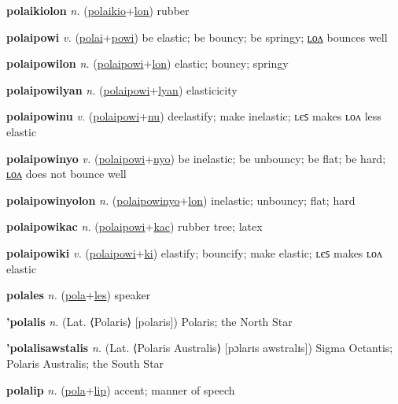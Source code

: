\textbf{\hypertarget{polaikiolon}{polaikiolon}} \textit{n.} (\hyperlink{polaikio}{polaikio}+\allowbreak \hyperlink{lon}{lon})
rubber

\textbf{\hypertarget{polaipowi}{polaipowi}} \textit{v.} (\hyperlink{polai}{polai}+\allowbreak \hyperlink{powi}{powi})
be elastic; be bouncy; be springy; \hyperlink{polaipowilon}{ʟᴏᴧ} bounces well

\textbf{\hypertarget{polaipowilon}{polaipowilon}} \textit{n.} (\hyperlink{polaipowi}{polaipowi}+\allowbreak \hyperlink{lon}{lon})
elastic; bouncy; springy

\textbf{\hypertarget{polaipowilyan}{polaipowilyan}} \textit{n.} (\hyperlink{polaipowi}{polaipowi}+\allowbreak \hyperlink{lyan}{lyan})
elasticicity

\textbf{\hypertarget{polaipowinu}{polaipowinu}} \textit{v.} (\hyperlink{polaipowi}{polaipowi}+\allowbreak \hyperlink{nu}{nu})
deelastify; make inelastic; ʟєꜱ makes ʟᴏᴧ less elastic

\textbf{\hypertarget{polaipowinyo}{polaipowinyo}} \textit{v.} (\hyperlink{polaipowi}{polaipowi}+\allowbreak \hyperlink{nyo}{nyo})
be inelastic; be unbouncy; be flat; be hard; \hyperlink{polaipowinyolon}{ʟᴏᴧ} does not bounce well

\textbf{\hypertarget{polaipowinyolon}{polaipowinyolon}} \textit{n.} (\hyperlink{polaipowinyo}{polaipowinyo}+\allowbreak \hyperlink{lon}{lon})
inelastic; unbouncy; flat; hard

\textbf{\hypertarget{polaipowikac}{polaipowikac}} \textit{n.} (\hyperlink{polaipowi}{polaipowi}+\allowbreak \hyperlink{kac}{kac})
rubber tree; latex

\textbf{\hypertarget{polaipowiki}{polaipowiki}} \textit{v.} (\hyperlink{polaipowi}{polaipowi}+\allowbreak \hyperlink{ki}{ki})
elastify; bouncify; make elastic; ʟєꜱ makes ʟᴏᴧ elastic

\textbf{\hypertarget{polales}{polales}} \textit{n.} (\hyperlink{pola}{pola}+\allowbreak \hyperlink{les}{les})
speaker

\textbf{\hypertarget{'polalis}{'polalis}} \textit{n.} (Lat. ⟨Polaris⟩ [polaris])
Polaris; the North Star

\textbf{\hypertarget{'polalisawstalis}{'polalisawstalis}} \textit{n.} (Lat. ⟨Polaris Australis⟩ [pɔlarɪs awstralɪs])
Sigma Octantis; Polaris Australis; the South Star

\textbf{\hypertarget{polalip}{polalip}} \textit{n.} (\hyperlink{pola}{pola}+\allowbreak \hyperlink{lip}{lip})
accent; manner of speech

